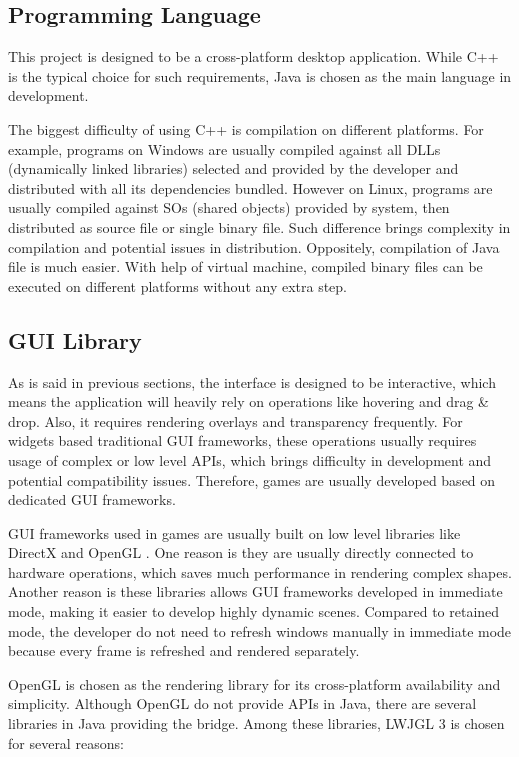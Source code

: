 \documentclass[msc,deptreport, cs]{infthesis}
\begin{document}
\subsection{Programming Language}

This project is designed to be a cross-platform desktop application. While C++ is the typical choice for such requirements, Java is chosen as the main language in development. 

The biggest difficulty of using C++ is compilation on different platforms. For example, programs on Windows are usually compiled against all DLLs (dynamically linked libraries) selected and provided by the developer and distributed with all its dependencies bundled. However on Linux, programs are usually compiled against SOs (shared objects) provided by system, then distributed as source file or single binary file. Such difference brings complexity in compilation and potential issues in distribution. Oppositely, compilation of Java file is much easier. With help of virtual machine, compiled binary files can be executed on different platforms without any extra step.

\subsection{GUI Library} \label{sec:opengl}

As is said in previous sections, the interface is designed to be interactive, which means the application will heavily rely on operations like hovering and drag \& drop. Also, it requires rendering overlays and transparency frequently. For widgets based traditional GUI frameworks, these operations usually requires usage of complex or low level APIs, which brings difficulty in development and potential compatibility issues. Therefore, games are usually developed based on dedicated GUI frameworks.

GUI frameworks used in games are usually built on low level libraries like DirectX and OpenGL \cite{openglw}. One reason is they are usually directly connected to hardware operations, which saves much performance in rendering complex shapes. Another reason is these libraries allows GUI frameworks developed in immediate mode, making it easier to develop highly dynamic scenes. Compared to retained mode, the developer do not need to refresh windows manually in immediate mode because every frame is refreshed and rendered separately.

OpenGL is chosen as the rendering library for its cross-platform availability and simplicity. Although OpenGL do not provide APIs in Java, there are several libraries in Java providing the bridge. Among these libraries, LWJGL 3 \cite{lwjgl} is chosen for several reasons:
\end{document}
